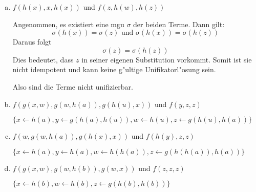 \documentclass[10pt, oneside]{article}
\begin{document}
\begin{enumerate}[(a)]
    \item $f(h(x), x, h(x))$ und $f(z, h(w), h(z))$

        Angenommen, es existiert eine mgu $\sigma$ der beiden Terme. Dann gilt:
        \begin{equation*}
            \sigma(h(x)) = \sigma(z) \text{ und } \sigma(h(x)) = \sigma(h(z))
        \end{equation*}
        Daraus folgt
        \begin{equation*}
            \sigma(z) = \sigma(h(z))
        \end{equation*}
        Dies bedeutet, dass $z$ in seiner eigenen Substitution vorkommt. Somit
        ist sie nicht idempotent und kann keine g"ultige Unifikatorl"osung
        sein.

        Also sind die Terme nicht unifizierbar.

    \item $f(g(x, w), g(w, h(a)), g(h(u), x))$ und $f(y, z, z)$

        $\{ x \leftarrow h(a), y \leftarrow g(h(a), h(u)), w \leftarrow h(u), z \leftarrow g(h(u), h(a))\}$

    \item $f(w, g(w, h(a)), g(h(x), x))$ und $f(h(y), z, z)$

        $\{ x \leftarrow h(a), y \leftarrow h(a), w \leftarrow h(h(a)), z \leftarrow g(h(h(a)), h(a)) \}$

    \item $f(g(x, w), g(w, h(b)), g(w, x))$ und $f(z, z, z)$

        $\{ x \leftarrow h(b), w \leftarrow h(b), z \leftarrow g(h(b), h(b)) \}$
\end{enumerate}
\end{document}
